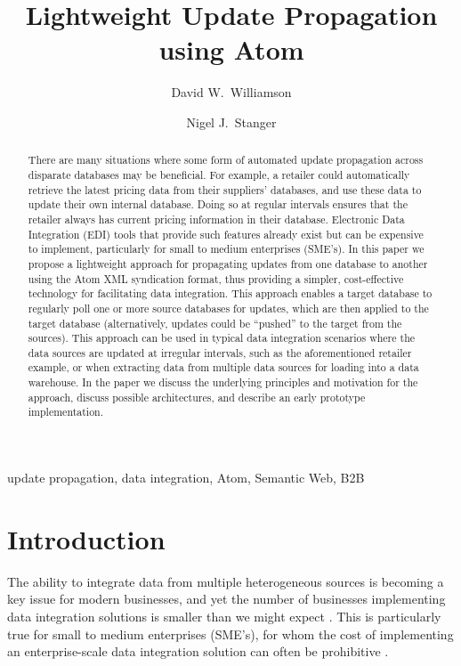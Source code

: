 \documentclass{CRPITStyle}
\title{Lightweight Update Propagation using Atom}
\author{David W.\ Williamson \and Nigel J.\ Stanger}
\affiliation{Department of Information Science, \\
	University of Otago, \\
	PO Box 56, Dunedin, New Zealand \\
	Email:~\texttt{\{dwilliamson,nstanger\}@infoscience.otago.ac.nz}}
\begin{document}
\maketitle


\begin{abstract}
There are many situations where some form of automated update
propagation across disparate databases may be beneficial. For example, a
retailer could automatically retrieve the latest pricing data from their
suppliers' databases, and use these data to update their own internal
database. Doing so at regular intervals ensures that the retailer always
has current pricing information in their database. Electronic Data
Integration (EDI) tools that provide such features already exist but can
be expensive to implement, particularly for small to medium enterprises
(SME's). In this paper we propose a lightweight approach for propagating
updates from one database to another using the Atom XML syndication
format, thus providing a simpler, cost-effective technology for
facilitating data integration. This approach enables a target database
to regularly poll one or more source databases for updates, which are
then applied to the target database (alternatively, updates could be
``pushed'' to the target from the sources). This approach can be used in
typical data integration scenarios where the data sources are updated at
irregular intervals, such as the aforementioned retailer example, or
when extracting data from multiple data sources for loading into a data
warehouse. In the paper we discuss the underlying principles and
motivation for the approach, discuss possible architectures, and
describe an early prototype implementation.
\end{abstract}
\vspace{.1in}

 update propagation, data integration, Atom,
Semantic Web, B2B


\section{Introduction}
\label{sec-intro}

The ability to integrate data from multiple heterogeneous sources is
becoming a key issue for modern businesses, and yet the number of
businesses implementing data integration solutions is smaller than we
might expect \cite{Beck-R-2002-Bled,vaHe-E-1999-EDI}. This is
particularly true for small to medium enterprises (SME's), for whom the
cost of implementing an enterprise-scale data integration solution can
often be prohibitive
\cite{Beck-R-2002-Bled,Guo-J-2003-DocEng,Somm-RA-2002-SIGMOD}.
\end{document}
